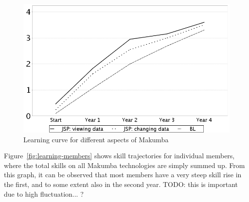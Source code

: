 \documentclass{acm_proc_article-sp}
\begin{document}
\begin{figure}\label{fig:learning-technologies}
  \includegraphics[width=0.98\columnwidth]{figures/learning-technologies}
  \caption{Learning curve for different aspects of Makumba}
\end{figure} 

Figure~\ref{fig:learning-members} shows skill trajectories for individual members, where the total skills on all Makumba technologies are simply summed up. From this graph, it can be observed that most members have a very steep skill rise in the first, and to some extent also in the second year. TODO: this is important due to high fluctuation... ?

\end{document}
